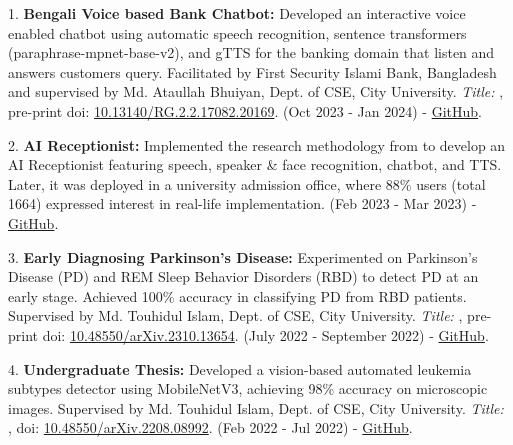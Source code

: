 

{{\fontsize{9pt}{1em}\bodyfont\color{graytext}

1. \textbf{Bengali Voice based Bank Chatbot:} Developed an interactive voice enabled chatbot using automatic speech recognition, sentence transformers (paraphrase-mpnet-base-v2), and gTTS for the banking domain that listen and answers customers query. Facilitated by First Security Islami Bank, Bangladesh and supervised by Md. Ataullah Bhuiyan, Dept. of CSE, City University. \textit{Title: }, pre-print doi: \href{http://dx.doi.org/10.13140/RG.2.2.17082.20169}{\textcolor{Cerulean}{10.13140/RG.2.2.17082.20169}}. (Oct 2023 - Jan 2024) - \href{https://github.com/taufiq-ai/A-Bengali-Speech-Chatbot-for-Banks}{\textcolor{Cerulean}{GitHub}}.

2. \textbf{AI Receptionist:} Implemented the research methodology from  to 
develop an AI Receptionist featuring speech, speaker \& face recognition, chatbot, and TTS. Later, it was deployed in a university admission office, where 88\% users (total 1664) expressed interest in real-life implementation. (Feb 2023 - Mar 2023) - \href{https://github.com/taufiq-ai/NLP-CV-Bengali_Speech_Chatbot}{\textcolor{Cerulean}{GitHub}}.

3. \textbf{Early Diagnosing Parkinson's Disease:} Experimented on Parkinson’s Disease (PD) and REM Sleep Behavior Disorders (RBD) to detect PD at an early stage. Achieved 100\% accuracy in classifying PD from RBD patients. Supervised by Md. Touhidul Islam, Dept. of CSE, City University. \textit{Title: }, pre-print doi: \href{https://doi.org/10.48550/arXiv.2310.13654}{\textcolor{Cerulean}{10.48550/arXiv.2310.13654}}. (July 2022 - September 2022) - \href{https://github.com/taufiq-ai/ML-Perkinsons_Disease_Detection}{\textcolor{Cerulean}{GitHub}}.

4. \textbf{Undergraduate Thesis:} Developed a vision-based automated leukemia subtypes detector using MobileNetV3, achieving 98\% accuracy on microscopic images. Supervised by Md. Touhidul Islam, Dept. of CSE, City University. \textit{Title: }, doi: \href{https://doi.org/10.48550/arXiv.2208.08992}{\textcolor{Cerulean}{10.48550/arXiv.2208.08992}}. (Feb 2022 - Jul 2022) - \href{https://github.com/taufiq-ai/Vision-Blood-Cancer-Stage-Detection}{\textcolor{Cerulean}{GitHub}}.

}}
